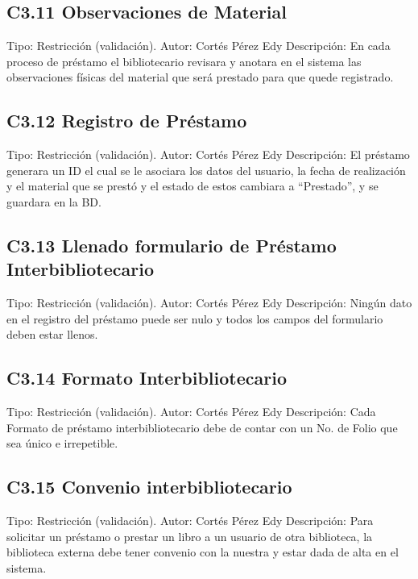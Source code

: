 \subsection{C3.11 Observaciones de Material}
	\UCli Tipo: Restricción (validación).
	\UCli Autor: Cortés Pérez Edy
	\UCli Descripción: En cada proceso de préstamo el bibliotecario revisara y anotara en el sistema las observaciones físicas del material que será prestado para que quede registrado.
	
\subsection{C3.12 Registro de Préstamo}
	\UCli Tipo: Restricción (validación).
	\UCli Autor: Cortés Pérez Edy
	\UCli Descripción: El préstamo generara un ID el cual se le asociara los datos del usuario, la fecha de realización y el material que se prestó y el estado de estos cambiara a “Prestado”, y se guardara en la BD.
	
\subsection{C3.13 Llenado formulario de Préstamo Interbibliotecario}
	\UCli Tipo: Restricción (validación).
	\UCli Autor: Cortés Pérez Edy
	\UCli Descripción: Ningún dato en el registro del préstamo puede ser nulo y todos los campos del formulario deben estar llenos.
	
\subsection{C3.14 Formato Interbibliotecario}
	\UCli Tipo: Restricción (validación).
	\UCli Autor: Cortés Pérez Edy
	\UCli Descripción: Cada Formato de préstamo interbibliotecario debe de contar con un No. de Folio que sea único e irrepetible.
	
\subsection{C3.15 Convenio interbibliotecario}
	\UCli Tipo: Restricción (validación).
	\UCli Autor: Cortés Pérez Edy
	\UCli Descripción: Para solicitar un préstamo o prestar un libro a un usuario de otra biblioteca, la biblioteca externa debe tener convenio con la nuestra y estar dada de alta en el sistema. 

